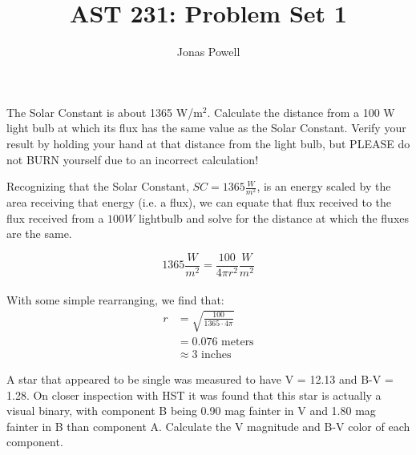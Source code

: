 \documentclass[12pt]{article}
\newenvironment{problem}[2][Problem]{\begin{trivlist}
\item[\hskip \labelsep {\bfseries #1}\hskip \labelsep {\bfseries #2.}]}{\end{trivlist}}
\newenvironment{answer}[2][Answer]{\begin{trivlist}
\item[\hskip \labelsep {\bfseries #1}\hskip \labelsep {\bfseries #2.}]}{\end{trivlist}}
\begin{document}

\title{AST 231: Problem Set 1}
\author{Jonas Powell}
\maketitle

\begin{problem}{1}
The Solar Constant is about 1365 W/m$^2$. Calculate the distance from a 100 W light bulb at which its flux has the same value as the Solar Constant. Verify your result by holding your hand at that distance from the light bulb, but PLEASE do not BURN yourself due to an incorrect calculation!
\end{problem}

\begin{answer}{1}

  Recognizing that the Solar Constant, $SC=1365 \frac{W}{m^{2}}$, is an energy scaled by the area receiving that energy (i.e. a flux), we can equate that flux received to the flux received from a $ 100 W $ lightbulb and solve for the distance at which the fluxes are the same.

  \begin{equation}
    1365 \frac{W}{m^{2}} = \frac{100}{4 \pi r^{2}} \frac{W}{m^{2}}
  \end{equation}
  \\

  With some simple rearranging, we find that:
  \\

  \begin{equation}
    \begin{align}
      r & = \sqrt{\frac{100}{1365 \cdot 4 \pi}} \\
      & = 0.076 \text{ meters} \\
      & \approx 3 \text{ inches}
    \end{align}
  \end{equation}

\end{answer}

\bigskip
\bigskip


\begin{problem}{2}
A star that appeared to be single was measured to have V = 12.13 and B-V = 1.28. On closer inspection with HST it was found that this star is actually a visual binary, with component B being 0.90 mag fainter in V and 1.80 mag fainter in B than component A. Calculate the V magnitude and B-V color of each component.
\end{problem}
\end{document}
